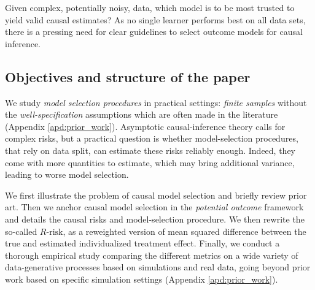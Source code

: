 \documentclass[10pt,twocolumn]{article}
\begin{document}
Given complex,
potentially noisy, data, which model is to be most trusted to yield valid causal
estimates? As no single learner performs best on all data sets, there is a
pressing need for clear guidelines to select outcome models for causal
inference.


\subsection{Objectives and structure of the paper}

We study \textit{model selection procedures} in practical settings:
\textit{finite samples} without the \textit{well-specification}
assumptions which are often made in the literature (Appendix
\ref{apd:prior_work}). Asymptotic causal-inference theory calls for complex
risks, but a practical question is whether model-selection procedures, that rely
on data split, can estimate these risks reliably enough. Indeed, they come with
more quantities to estimate, which may bring additional variance, leading to
worse model selection.

We first illustrate the problem of causal model selection and briefly review
prior art. Then we anchor causal model selection in the \emph{potential outcome}
framework and details the causal risks and model-selection procedure. We then
rewrite the so-called $R\text{-risk}$, as a reweighted version of mean squared
difference between the true and estimated individualized treatment effect.
Finally, we conduct a thorough empirical study comparing the different metrics
on a wide variety of data-generative processes based on simulations and real
data, going beyond prior work based on specific simulation settings
\citep{schuler_comparison_2018,alaa_validating_2019} (Appendix
\ref{apd:prior_work}).

\end{document}
